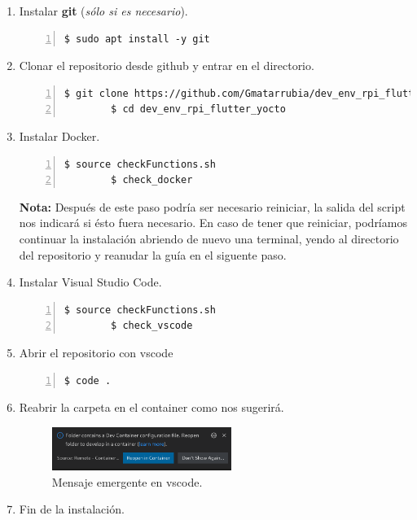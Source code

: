 \begin{enumerate}
    \item Instalar \textbf{\gls{git}} (\emph{sólo si es necesario}).
    \begin{lstlisting}[style=consola, numbers=left]
        $ sudo apt install -y git
    \end{lstlisting}

    \item Clonar el repositorio desde github y entrar en el directorio.
    \begin{lstlisting}[style=consola, numbers=left]
        $ git clone https://github.com/Gmatarrubia/dev_env_rpi_flutter_yocto.git
        $ cd dev_env_rpi_flutter_yocto
    \end{lstlisting}

    \item Instalar Docker.
    \begin{lstlisting}[style=consola, numbers=left]
        $ source checkFunctions.sh
        $ check_docker
    \end{lstlisting}
    \textbf{Nota:} Después de este paso podría ser necesario reiniciar, la salida del
    script nos indicará si ésto fuera necesario. En caso de tener que reiniciar,
    podríamos continuar la instalación abriendo de nuevo una terminal, yendo al directorio
    del repositorio y reanudar la guía en el siguente paso.

    \item Instalar Visual Studio Code.
    \begin{lstlisting}[style=consola, numbers=left]
        $ source checkFunctions.sh
        $ check_vscode
    \end{lstlisting}

    \item Abrir el repositorio con \gls{vscode}
    \begin{lstlisting}[style=consola, numbers=left]
        $ code .
    \end{lstlisting}

    \item Reabrir la carpeta en el container como nos sugerirá.
    \begin{figure}[H]
        \centering
        \includegraphics[width=0.55\textwidth]{imgs/dev-container}
        \caption[Mensaje emergente en vscode]{Mensaje emergente en vscode.}
        \label{imgs:vscode-devcontainer2}
    \end{figure}

    \item Fin de la instalación.
\end{enumerate}

